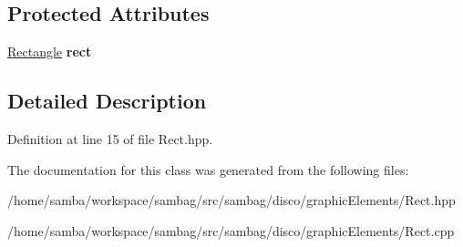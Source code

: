 \subsection*{Protected Attributes}
\begin{DoxyCompactItemize}
\item 
\hypertarget{classsambag_1_1disco_1_1graphic_elements_1_1_rect_a676f2829e7383023f03ecec87ef203c2}{
\hyperlink{classsambag_1_1com_1_1_rectangle}{Rectangle} {\bfseries rect}}
\label{classsambag_1_1disco_1_1graphic_elements_1_1_rect_a676f2829e7383023f03ecec87ef203c2}

\end{DoxyCompactItemize}


\subsection{Detailed Description}


Definition at line 15 of file Rect.hpp.



The documentation for this class was generated from the following files:\begin{DoxyCompactItemize}
\item 
/home/samba/workspace/sambag/src/sambag/disco/graphicElements/Rect.hpp\item 
/home/samba/workspace/sambag/src/sambag/disco/graphicElements/Rect.cpp\end{DoxyCompactItemize}
